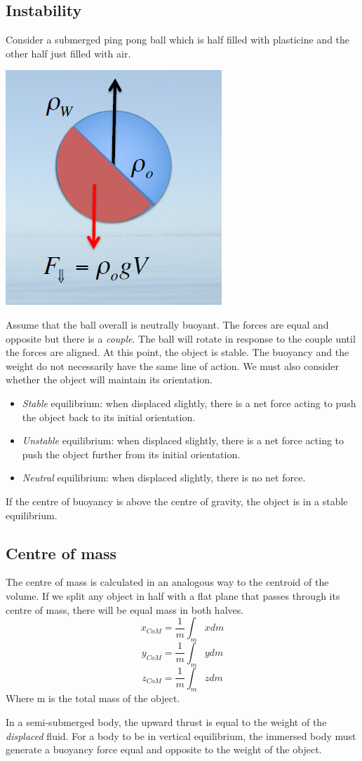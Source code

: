\documentclass[class=report, crop=false, 12pt,a4paper]{standalone}
\begin{document}
\subsection{Instability}
Consider a submerged ping pong ball which is half filled with plasticine and the other half just filled with air.
\begin{center}
  \includegraphics[width = 0.4 \textwidth]{../img/InstabilityPingPong}
\end{center}
Assume that the ball overall is neutrally buoyant. The forces are equal and opposite but there is a \emph{couple}. The ball will rotate in response to the couple until the forces are aligned. At this point, the object is stable. The buoyancy and the weight do not necessarily have the same line of action. We must also consider whether the object will maintain its orientation. 
\begin{itemize}
  \item \emph{Stable} equilibrium: when displaced slightly, there is a net force acting to push the object back to its initial orientation.
  \item \emph{Unstable} equilibrium: when displaced slightly, there is a net force acting to push the object further from its initial orientation.
  \item \emph{Neutral} equilibrium: when displaced slightly, there is no net force. 
\end{itemize}
If the centre of buoyancy is above the centre of gravity, the object is in a stable equilibrium. 
\subsection{Centre of mass}
The centre of mass is calculated in an analogous way to the centroid of the volume. If we split any object in half with a flat plane that passes through its centre of mass, there will be equal mass in both halves.
\[ x_{CoM} = \frac{1}{m}\int_m x dm \]
\[ y_{CoM} = \frac{1}{m}\int_m y dm \]
\[ z_{CoM} = \frac{1}{m}\int_m z dm \]
Where m is the total mass of the object. 

In a semi-submerged body, the upward thrust is equal to the weight of the \emph{displaced} fluid. For a body to be in vertical equilibrium, the immersed body must generate a buoyancy force equal and opposite to the weight of the object.
\end{document}
